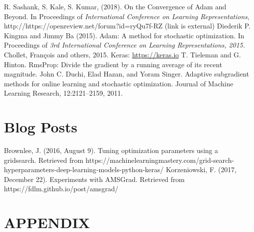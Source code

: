 \documentclass[letterpaper, 10 pt, conference]{ieeeconf}  %
\begin{document}
 
\addtolength{\textheight}{-12cm}   %




\begin{thebibliography}{99}
 R. Sashank, S. Kale, S. Kumar, (2018). On the Convergence of Adam and Beyond. In Proceedings of \emph{International Conference on Learning Representations}, http://https://openreview.net/forum?id=ryQu7f-RZ (link is external)
 Diederik P. Kingma and Jimmy Ba (2015). Adam: A method for stochastic optimization. In Proceedings
of \emph{3rd International Conference on Learning Representations, 2015.}
 Chollet, Fran\c{c}ois and others, 2015. Keras: \url{https://keras.io}
 T. Tieleman and G. Hinton. RmsProp: Divide the gradient by a running average of its recent magnitude.
 John C. Duchi, Elad Hazan, and Yoram Singer. Adaptive subgradient methods for online learning
and stochastic optimization. Journal of Machine Learning Research, 12:2121–2159, 2011.

\section*{Blog Posts}

 Brownlee, J. (2016, August 9). Tuning optimization parameters using a gridsearch. Retrieved from https://machinelearningmastery.com/grid-search-hyperparameters-deep-learning-models-python-keras/
 Korzeniowski, F. (2017, December 22). Experiments with AMSGrad. Retrieved from https://fdlm.github.io/post/amsgrad/

\end{thebibliography}
\newpage
\section{APPENDIX}
\end{document}
